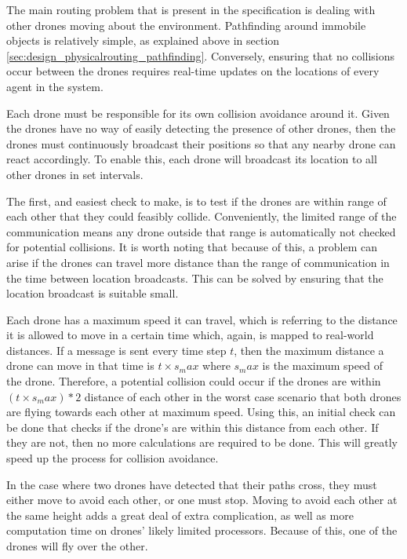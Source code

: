 The main routing problem that is present in the specification is dealing with other drones moving about the environment. Pathfinding around immobile objects is relatively simple, as explained above in section \ref{sec:design_physicalrouting_pathfinding}. Conversely, ensuring that no collisions occur between the drones requires real-time updates on the locations of every agent in the system.

Each drone must be responsible for its own collision avoidance around it. Given the drones have no way of easily detecting the presence of other drones, then the drones must continuously broadcast their positions so that any nearby drone can react accordingly. To enable this, each drone will broadcast its location to all other drones in set intervals.

The first, and easiest check to make, is to test if the drones are within range of each other that they could feasibly collide. Conveniently, the limited range of the communication means any drone outside that range is automatically not checked for potential collisions. It is worth noting that because of this, a problem can arise if the drones can travel more distance than the range of communication in the time between location broadcasts. This can be solved by ensuring that the location broadcast is suitable small.

Each drone has a maximum speed it can travel, which is referring to the distance it is allowed to move in a certain time which, again, is mapped to real-world distances. If a message is sent every time step $t$, then the maximum distance a drone can move in that time is $t \times s_max$ where $s_max$ is the maximum speed of the drone. Therefore, a potential collision could occur if the drones are within $(t \times s_max) * 2$ distance of each other in the worst case scenario that both drones are flying towards each other at maximum speed. Using this, an initial check can be done that checks if the drone's are within this distance from each other. If they are not, then no more calculations are required to be done. This will greatly speed up the process for collision avoidance.

In the case where two drones have detected that their paths cross, they must either move to avoid each other, or one must stop. Moving to avoid each other at the same height adds a great deal of extra complication, as well as more computation time on drones' likely limited processors. Because of this, one of the drones will fly over the other.

